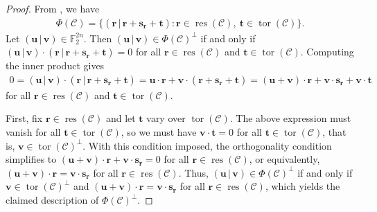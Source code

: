\documentclass[10pt,a4paper]{amsart}
\begin{document}
\begin{proof}
From , we have
\begin{align*}
\Phi(\mathcal{C})
=
\{
(\mathbf{r} \, |  \,  \mathbf{r} + \mathbf{s}_{\mathbf{r}} + \mathbf{t})
\mathrel{:}
\mathbf{r} \in \operatorname{res}(\mathcal{C})  ,  \
\mathbf{t} \in \operatorname{tor}(\mathcal{C})
\}  .
\end{align*}
Let $(\mathbf{u} \, | \, \mathbf{v}) \in \mathbb{F}_2^{2n}$. Then
$(\mathbf{u} \, | \, \mathbf{v}) \in \Phi(\mathcal{C})^\perp$ if and only if
$
(\mathbf{u} \, | \,  \mathbf{v})
\cdot
(\mathbf{r} \, |  \,  \mathbf{r} + \mathbf{s}_{\mathbf{r}} + \mathbf{t})
= 0
$
for all $\mathbf{r} \in \operatorname{res}(\mathcal{C})$ and $\mathbf{t} \in \operatorname{tor}(\mathcal{C})$. Computing the inner product
gives
\begin{align*}
0
=
(\mathbf{u} \, | \,  \mathbf{v})
\cdot
(\mathbf{r} \, |  \,  \mathbf{r} + \mathbf{s}_{\mathbf{r}} + \mathbf{t})    %
=
\mathbf{u} \cdot \mathbf{r}
+
\mathbf{v} \cdot (\mathbf{r} + \mathbf{s}_{\mathbf{r}} + \mathbf{t})   %
=
(\mathbf{u} + \mathbf{v}) \cdot \mathbf{r}
+
\mathbf{v} \cdot \mathbf{s}_{\mathbf{r}}
+
\mathbf{v} \cdot \mathbf{t}
\end{align*}
for all $\mathbf{r} \in \operatorname{res}(\mathcal{C})$ and $\mathbf{t} \in \operatorname{tor}(\mathcal{C})$.

First, fix $\mathbf{r} \in \operatorname{res}(\mathcal{C})$ and let $\mathbf{t}$ vary over $\operatorname{tor}(\mathcal{C})$. The above
expression must vanish for all $\mathbf{t} \in \operatorname{tor}(\mathcal{C})$, so we must have
$\mathbf{v} \cdot \mathbf{t} = 0$ for all $\mathbf{t} \in \operatorname{tor}(\mathcal{C})$, that is,
$
\mathbf{v} \in \operatorname{tor}(\mathcal{C})^\perp.
$
With this condition imposed, the orthogonality condition simplifies to
$
(\mathbf{u} + \mathbf{v}) \cdot \mathbf{r}
+
\mathbf{v} \cdot \mathbf{s}_{\mathbf{r}}
=
0
$
for all $\mathbf{r} \in \operatorname{res}(\mathcal{C})$,
or equivalently,
$
(\mathbf{u} + \mathbf{v}) \cdot \mathbf{r}
=
\mathbf{v} \cdot \mathbf{s}_{\mathbf{r}}
$
for all $\mathbf{r} \in \operatorname{res}(\mathcal{C})$.
Thus, $(\mathbf{u} \, | \, \mathbf{v}) \in \Phi(\mathcal{C})^\perp$ if and only if
$\mathbf{v} \in \operatorname{tor}(\mathcal{C})^\perp$ and
$
(\mathbf{u} + \mathbf{v}) \cdot \mathbf{r}
=
\mathbf{v} \cdot \mathbf{s}_{\mathbf{r}}
$
for all  $\mathbf{r} \in \operatorname{res}(\mathcal{C})
$,
which yields the claimed description of $\Phi(\mathcal{C})^\perp$.


\end{proof}
\end{document}
